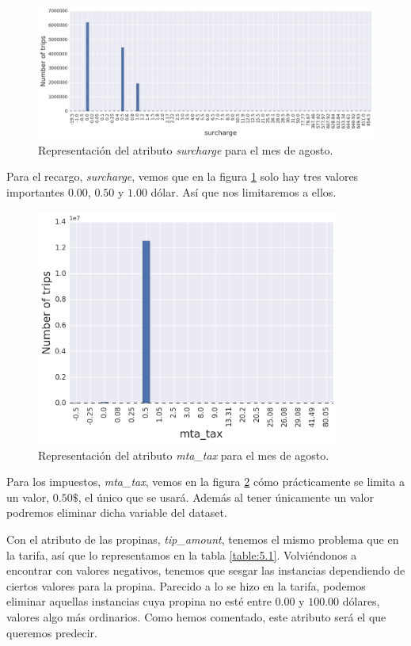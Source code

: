 \begin{figure}[H]
  \centering
  \includegraphics[width=140mm]{figures/ch_05/surcharge.png}
  \caption{Representación del atributo \emph{surcharge} para el mes de agosto.}
  \label{fig:5.4}
\end{figure}

Para el recargo, \emph{surcharge}, vemos que en la figura \ref{fig:5.4} solo hay tres valores importantes $0.00$, $0.50$ y $1.00$ dólar. Así que nos limitaremos a ellos.

\begin{figure}[H]
  \centering
  \includegraphics[width=100mm]{figures/ch_05/mta_tax.png}
  \caption{Representación del atributo \emph{mta\_tax} para el mes de agosto.}
  \label{fig:5.5}
\end{figure}

Para los impuestos, \emph{mta\_tax}, vemos en la figura \ref{fig:5.5} cómo prácticamente se limita a un valor, $0.50\$$, el único que se usará. Además al tener únicamente un valor podremos eliminar dicha variable del dataset.

Con el atributo de las propinas, \emph{tip\_amount}, tenemos el mismo problema que en la tarifa, así que lo representamos en la tabla \ref{table:5.1}. Volviéndonos a encontrar con valores negativos, tenemos que sesgar las instancias dependiendo de ciertos valores para la propina. Parecido a lo se hizo en la tarifa, podemos eliminar aquellas instancias cuya propina no esté entre $0.00$ y $100.00$ dólares, valores algo más ordinarios. Como hemos comentado, este atributo será el que queremos predecir.

